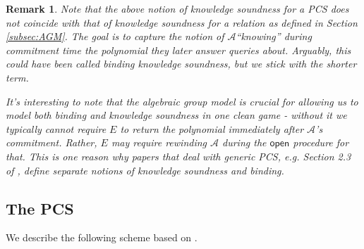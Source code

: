 \documentclass[11pt]{article} %
\newcommand{\adv}{\ensuremath{\mathcal A}\xspace}
\newcommand{\open}{\ensuremath{\mathsf{open}}\xspace}
\newcommand{\ext}{\ensuremath{E}\xspace}
\newtheorem{remark}[lemma]{Remark}
\begin{document}
\begin{remark}
 Note that the above notion of knowledge soundness for a PCS does not coincide with that of knowledge soundness for a \emph{relation} as defined in Section \ref{subsec:AGM}. The goal is to capture the notion of \adv ``knowing'' during commitment time the polynomial they later  answer queries about. Arguably, this could have been called \emph{binding knowledge soundness}, but we stick with the shorter term. 

 It's interesting to note that the algebraic group model is crucial for allowing us to  model both binding and knowledge soundness in one clean game - without
 it we typically cannot require \ext to return the polynomial immediately after \adv's commitment. Rather, \ext may require rewinding \adv during the \open procedure for that. This is one reason why papers that deal with generic PCS, e.g. Section 2.3 of \cite{hinf}, define separate notions of knowledge soundness and binding.
\end{remark}
\subsection{The PCS}

We describe the following scheme based on \cite{kate,sonic}.
\end{document}
